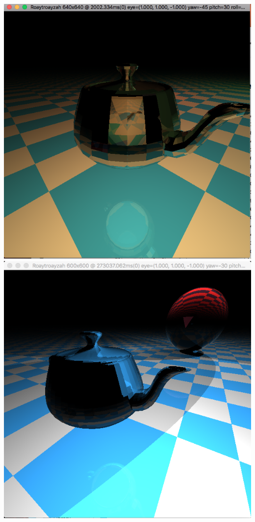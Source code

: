 \includegraphics[width=\textwidth]{img/earlyTeapot}
\includegraphics[width=\textwidth]{img/earlyTeapotSphere}

